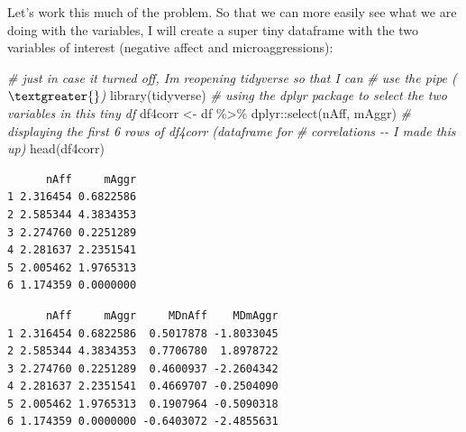 \documentclass[
  11pt,
]{book}
\newenvironment{Shaded}{\begin{snugshade}}{\end{snugshade}}
\newcommand{\CommentTok}[1]{\textcolor[rgb]{0.56,0.35,0.01}{\textit{#1}}}
\newcommand{\FunctionTok}[1]{\textcolor[rgb]{0.00,0.00,0.00}{#1}}
\newcommand{\NormalTok}[1]{#1}
\newcommand{\OtherTok}[1]{\textcolor[rgb]{0.56,0.35,0.01}{#1}}
\newcommand{\SpecialCharTok}[1]{\textcolor[rgb]{0.00,0.00,0.00}{#1}}
\begin{document}
Let's work this much of the problem. So that we can more easily see what we are doing with the variables, I will create a super tiny dataframe with the two variables of interest (negative affect and microaggressions):

\begin{Shaded}
\begin{Highlighting}[]
\CommentTok{\# just in case it turned off, I\textquotesingle{}m reopening tidyverse so that I can}
\CommentTok{\# use the pipe ($\textgreater{}$)}
\FunctionTok{library}\NormalTok{(tidyverse)}
\CommentTok{\# using the dplyr package to select the two variables in this tiny df}
\NormalTok{df4corr }\OtherTok{\textless{}{-}}\NormalTok{ df }\SpecialCharTok{\%\textgreater{}\%}
\NormalTok{    dplyr}\SpecialCharTok{::}\FunctionTok{select}\NormalTok{(nAff, mAggr)}
\CommentTok{\# displaying the first 6 rows of df4corr (\textquotesingle{}dataframe for}
\CommentTok{\# correlations\textquotesingle{} {-}{-} I made this up)}
\FunctionTok{head}\NormalTok{(df4corr)}
\end{Highlighting}
\end{Shaded}

\begin{verbatim}
      nAff     mAggr
1 2.316454 0.6822586
2 2.585344 4.3834353
3 2.274760 0.2251289
4 2.281637 2.2351541
5 2.005462 1.9765313
6 1.174359 0.0000000
\end{verbatim}

\begin{Shaded}
\end{Shaded}

\begin{verbatim}
      nAff     mAggr     MDnAff    MDmAggr
1 2.316454 0.6822586  0.5017878 -1.8033045
2 2.585344 4.3834353  0.7706780  1.8978722
3 2.274760 0.2251289  0.4600937 -2.2604342
4 2.281637 2.2351541  0.4669707 -0.2504090
5 2.005462 1.9765313  0.1907964 -0.5090318
6 1.174359 0.0000000 -0.6403072 -2.4855631
\end{verbatim}
\end{document}
